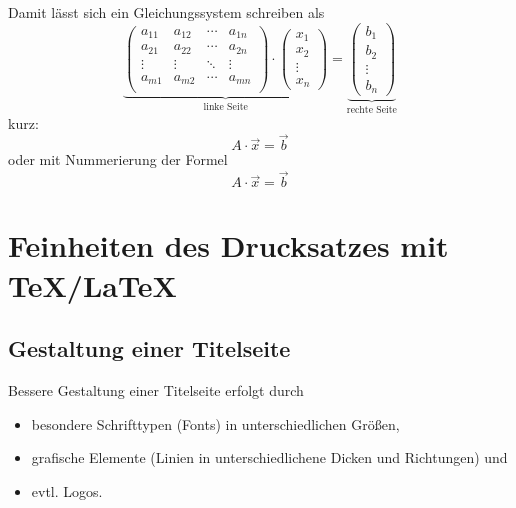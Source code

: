 Damit lässt sich ein Gleichungssystem schreiben als
\[
    \underbrace{
      \left(
          \begin{array}{*{4}{c}}
            a_{11} & a_{12} & \cdots & a_{1n} \\
            a_{21} & a_{22} & \cdots & a_{2n} \\
            \vdots & \vdots & \ddots & \vdots \\
            a_{m1} & a_{m2} & \cdots & a_{mn} \\
          \end{array}
      \right)
      \cdot
      \left(
          \begin{array}{c}
            x_{1} \\
            x_{2} \\
            \vdots \\
            x_{n}
          \end{array}
      \right)
    }_{\text{linke Seite}}
    =
    \underbrace{
      \left(
          \begin{array}{c}
            b_{1} \\
            b_{2} \\
            \vdots \\
            b_{n}
          \end{array}
      \right)
    }_{\text{rechte Seite}}
\]
kurz:
\[
    A\cdot\vec{x}=\vec{b}
\]
oder mit Nummerierung der Formel
\begin{equation}
    A\cdot\vec{x}=\vec{b}
\end{equation}


\section{Feinheiten des Drucksatzes mit \TeX/\LaTeX}

\subsection{Gestaltung einer Titelseite}

Bessere Gestaltung einer Titelseite erfolgt durch
\begin{itemize}
  \item besondere Schrifttypen (Fonts) in unterschiedlichen Größen,
  \item grafische Elemente (Linien in unterschiedlichene Dicken und
    Richtungen) und
  \item evtl. Logos.
\end{itemize}

